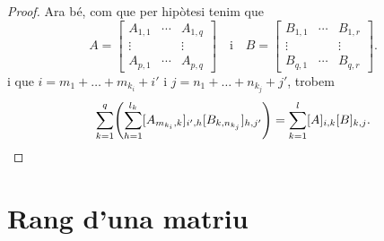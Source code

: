 \documentclass[../../Main.tex]{subfiles}
\begin{document}
\begin{proposition}
\begin{proof}
			Ara bé, com que per hipòtesi tenim que
			\[A=\left[\begin{matrix}
			A_{1,1} & \cdots & A_{1,q} \\
			\vdots & & \vdots \\
			A_{p,1} & \cdots & A_{p,q}
			\end{matrix}\right]\quad\text{i}\quad B=\left[\begin{matrix}
			B_{1,1} & \cdots & B_{1,r} \\
			\vdots & & \vdots \\
			B_{q,1} & \cdots & B_{q,r}
			\end{matrix}\right].\]
			i que \(i=m_{1}+\dots+m_{k_{i}}+i'\) i \(j=n_{1}+\dots+n_{k_{j}}+j'\), trobem
			\[
			    \sum_{k=1}^{q}\left(\sum_{h=1}^{l_{k}}[A_{m_{k_{i}},k}]_{i',h}[B_{k,n_{k_{j}}}]_{h,j'}\right)=\sum_{k=1}^{l}[A]_{i,k}[B]_{k,j}.\qedhere
			\]
		\end{proof}
	\end{proposition}
\section{Rang d'una matriu}
\end{document}
